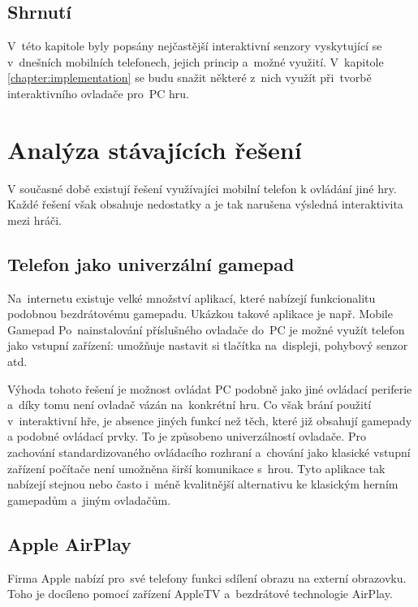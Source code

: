 \documentclass[thesis=B,czech,hidelinks]{FITthesis}[2012/06/26] %
\begin{document}
\section{Shrnutí}

V~této kapitole byly popsány nejčastější interaktivní senzory vyskytující se v~dnešních mobilních telefonech, jejich princip a~možné využití. V~kapitole \ref{chapter:implementation} se budu snažit některé z~nich využít při~tvorbě interaktivního ovladače pro~PC hru. 

\chapter{Analýza stávajících řešení}

V současné době existují řešení využívajíci mobilní telefon k ovládání jiné hry. Každé řešení však obsahuje nedostatky a je tak narušena výsledná interaktivita mezi hráči.

\section{Telefon jako univerzální gamepad}

Na~internetu existuje velké množství aplikací, které nabízejí funkcionalitu podobnou bezdrátovému gamepadu. Ukázkou takové aplikace je např. Mobile Gamepad \cite{mobilegamepad} Po~nainstalování příslušného ovladače do~PC je možné využít telefon jako vstupní zařízení: umožňuje nastavit si tlačítka na~displeji, pohybový senzor atd.

Výhoda tohoto řešení je možnost ovládat PC podobně jako jiné ovládací periferie a~díky tomu není ovladač vázán na~konkrétní hru. Co však brání použití v~interaktivní hře, je absence jiných funkcí než těch, které již obsahují gamepady a podobné ovládací prvky. To je způsobeno univerzálností ovladače. Pro zachování standardizovaného ovládacího rozhraní a~chování jako klasické vstupní zařízení počítače není umožněna širší komunikace s~hrou. Tyto aplikace tak nabízejí stejnou nebo často i~méně kvalitnější alternativu ke klasickým herním gamepadům a~jiným ovladačům. 

\section{Apple AirPlay}

Firma Apple nabízí pro~své telefony funkci sdílení obrazu na externí obrazovku. Toho je docíleno pomocí zařízení AppleTV a~bezdrátové technologie AirPlay\cite{airplay}.
\end{document}
